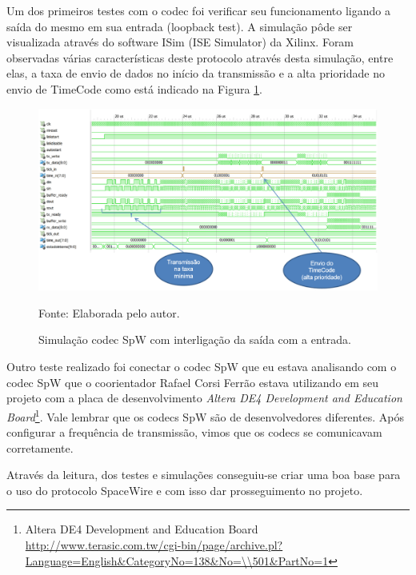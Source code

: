 \documentclass[
	12pt,				%
	openright,			%
	twoside,			%
	a4paper,			%
	english,			%
	french,				%
	spanish,			%
	brazil				%
	]{abntex2}
\begin{document}
Um dos primeiros testes com o codec foi verificar seu funcionamento ligando a saída do mesmo em sua entrada (loopback test). A simulação pôde ser visualizada através do software ISim (ISE Simulator) da Xilinx. Foram observadas várias características deste protocolo através desta simulação, entre elas, a taxa de envio de dados no início da transmissão e a alta prioridade no envio de TimeCode como está indicado na Figura \ref{SimulSpW_1}.

\begin{figure}[!htb]
	\centering
	\caption{Simulação codec SpW com interligação da saída com a entrada.}
	\includegraphics[scale = 0.7, angle = 90]{Imagens/SimulSpW_1}
	
	Fonte: Elaborada pelo autor.
	
	\label{SimulSpW_1}
\end{figure}

Outro teste realizado foi conectar o codec SpW que eu estava analisando com o codec SpW que o coorientador Rafael Corsi Ferrão estava utilizando em seu projeto com a placa de desenvolvimento \textit{Altera DE4 Development and Education Board}\footnote{Altera DE4 Development and Education Board \url{http://www.terasic.com.tw/cgi-bin/page/archive.pl?Language=English\&CategoryNo=138\&No=\\501\&PartNo=1}}. Vale lembrar que os codecs SpW são de desenvolvedores diferentes. Após configurar a frequência de transmissão, vimos que os codecs se comunicavam corretamente.

Através da leitura, dos testes e simulações conseguiu-se criar uma boa base para o uso do protocolo SpaceWire e com isso dar prosseguimento no projeto.


\end{document}
